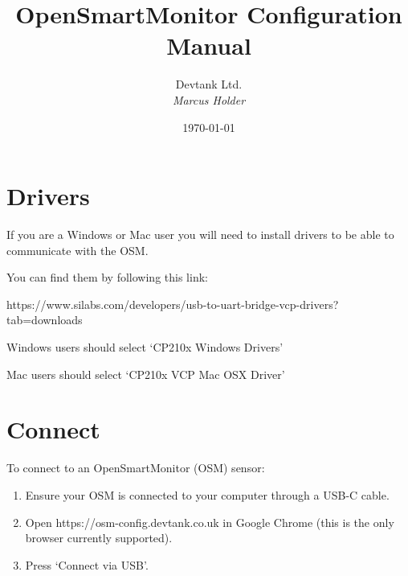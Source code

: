 \documentclass[a4paper,12pt, notitlepage]{article}
\begin{document}
\title{\textbf{\large{OpenSmartMonitor Configuration Manual}}}

\author{\normalsize{Devtank Ltd.} \\
        \small\textit{
        Marcus Holder}}
\date{\today}

\maketitle 
\thispagestyle{fancy}


\begin{abstract} 
\noindent
\end{abstract}
\vspace{11mm}

\newpage
\tableofcontents
\newpage

\section{Drivers}

If you are a Windows or Mac user you will need to install drivers to be able to communicate with the OSM.

You can find them by following this link:

https://www.silabs.com/developers/usb-to-uart-bridge-vcp-drivers?tab=downloads

Windows users should select `CP210x Windows Drivers'

Mac users should select `CP210x VCP Mac OSX Driver'

\newpage
\section{Connect}
\label{sec: connect}

To connect to an OpenSmartMonitor (OSM) sensor:
\begin{enumerate}
	\item Ensure your OSM is connected to your computer through a USB-C cable.
	\item Open https://osm-config.devtank.co.uk in Google Chrome (this is the only browser currently supported).
	\item Press `Connect via USB'.
\end{enumerate}
\end{document}
